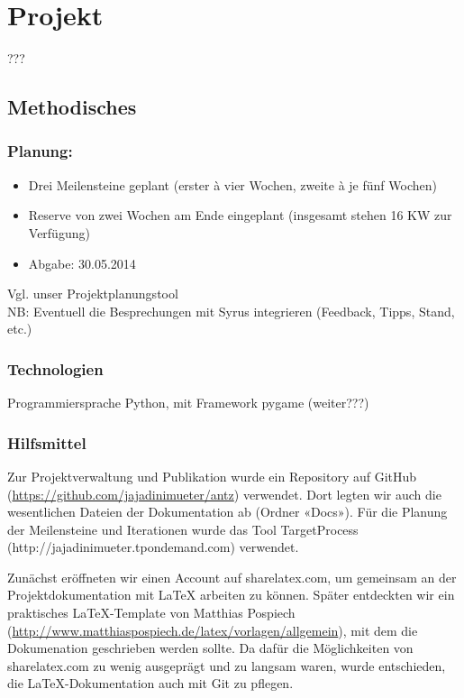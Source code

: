 
\chapter{Projekt}

???

\section{Methodisches}


\subsection*{Planung:}

\begin{itemize}[noitemsep]
\item Drei Meilensteine geplant (erster à vier Wochen, zweite à je fünf Wochen)
\item Reserve von zwei Wochen am Ende eingeplant (insgesamt stehen 16 KW zur Verfügung)
\item Abgabe: 30.05.2014
\end{itemize}

\vspace*{1cm}

Vgl. unser Projektplanungstool \\

NB: Eventuell die Besprechungen mit Syrus integrieren (Feedback, Tipps, Stand, etc.) \\



\subsection{Technologien}

Programmiersprache Python, mit Framework pygame (weiter???)

\vspace*{1cm}


\subsection{Hilfsmittel}

Zur Projektverwaltung und Publikation wurde ein Repository auf GitHub (\url{https://github.com/jajadinimueter/antz}) verwendet. Dort legten wir auch die wesentlichen Dateien der Dokumentation ab (Ordner «Docs»). Für die Planung der Meilensteine und Iterationen wurde das Tool TargetProcess (http://jajadinimueter.tpondemand.com) verwendet.



\vspace*{1cm}

Zunächst eröffneten wir einen Account auf sharelatex.com, um gemeinsam an der Projektdokumentation mit LaTeX arbeiten zu können. Später entdeckten wir ein praktisches LaTeX-Template von Matthias Pospiech (\url{http://www.matthiaspospiech.de/latex/vorlagen/allgemein}), mit dem die Dokumenation geschrieben werden sollte. Da dafür die Möglichkeiten von sharelatex.com zu wenig ausgeprägt und zu langsam waren, wurde entschieden, die LaTeX-Dokumentation auch mit Git zu pflegen.

